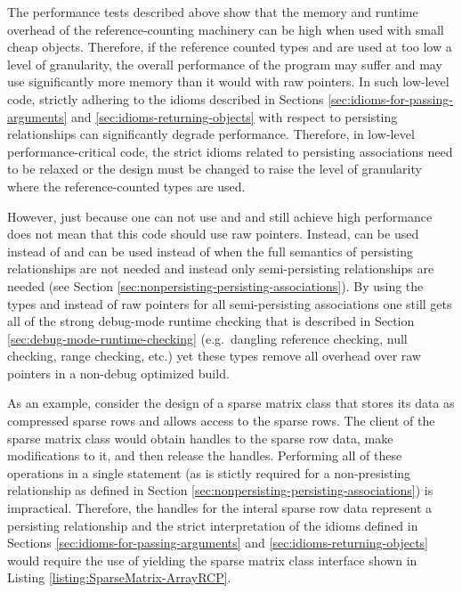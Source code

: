 \documentclass[pdf,ps2pdf,11pt]{SANDreport}
\begin{document}
The performance tests described above show that the memory and runtime
overhead of the reference-counting machinery can be high when used
with small cheap objects.  Therefore, if the reference counted types
{} and {} are used at too low a level of
granularity, the overall performance of the program may suffer and may
use significantly more memory than it would with raw pointers.  In
such low-level code, strictly adhering to the idioms described in
Sections {}\ref{sec:idioms-for-passing-arguments} and
{}\ref{sec:idioms-returning-objects} with respect to persisting
relationships can significantly degrade performance.  Therefore, in
low-level performance-critical code, the strict idioms related to
persisting associations need to be relaxed or the design must be
changed to raise the level of granularity where the reference-counted
types are used.

However, just because one can not use {} and {}
and still achieve high performance does not mean that this code should
use raw pointers.  Instead, {} can be used instead of
{} and {} can be used instead of
{} when the full semantics of persisting relationships
are not needed and instead only semi-persisting relationships are
needed (see Section
{}\ref{sec:nonpersisting-persisting-associations}).  By using the
types {} and {} instead of raw pointers for
all semi-persisting associations one still gets all of the strong
debug-mode runtime checking that is described in Section
{}\ref{sec:debug-mode-runtime-checking} (e.g.\ dangling reference
checking, null checking, range checking, etc.) yet these types remove
all overhead over raw pointers in a non-debug optimized build.

As an example, consider the design of a sparse matrix class that
stores its data as compressed sparse rows and allows access to the
sparse rows.  The client of the sparse matrix class would obtain
handles to the sparse row data, make modifications to it, and then
release the handles.  Performing all of these operations in a single
statement (as is stictly required for a non-presisting relationship as
defined in Section {}\ref{sec:nonpersisting-persisting-associations})
is impractical.  Therefore, the handles for the interal sparse row
data represent a persisting relationship and the strict interpretation
of the idioms defined in Sections
{}\ref{sec:idioms-for-passing-arguments} and
{}\ref{sec:idioms-returning-objects} would require the use of
{} yielding the sparse matrix class interface shown
in Listing {}\ref{listing:SparseMatrix-ArrayRCP}.
\end{document}
